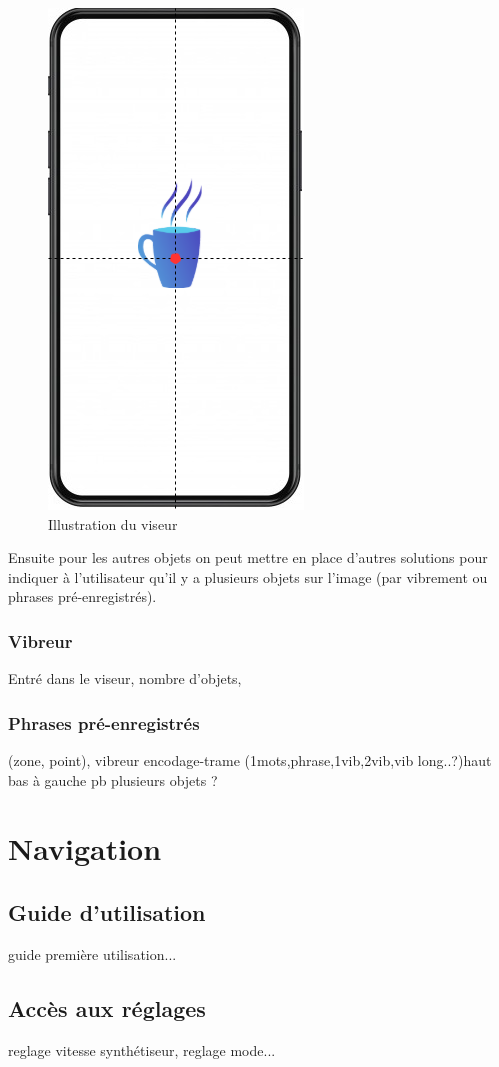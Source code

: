 \documentclass[UTF8]{EPURapport}
\begin{document}
\begin{figure}[h!]
\centering
  \includegraphics[width=.4\textwidth]{images/viseur.png}
  \caption{Illustration du viseur}
  \label{fig:viseur}
\end{figure}

Ensuite pour les autres objets on peut mettre en place d'autres solutions pour indiquer à l'utilisateur qu'il y a plusieurs objets sur l'image (par vibrement ou phrases pré-enregistrés).

\subsubsection{Vibreur}
Entré dans le viseur, nombre d'objets, 
\subsubsection{Phrases pré-enregistrés}
(zone, point),
vibreur
encodage-trame (1mots,phrase,1vib,2vib,vib long..?)haut bas à gauche
pb plusieurs objets ?

\section{Navigation}
\subsection{Guide d'utilisation}
guide première utilisation...
\subsection{Accès aux réglages}
reglage vitesse synthétiseur, reglage mode...

\annexes
\end{document}
